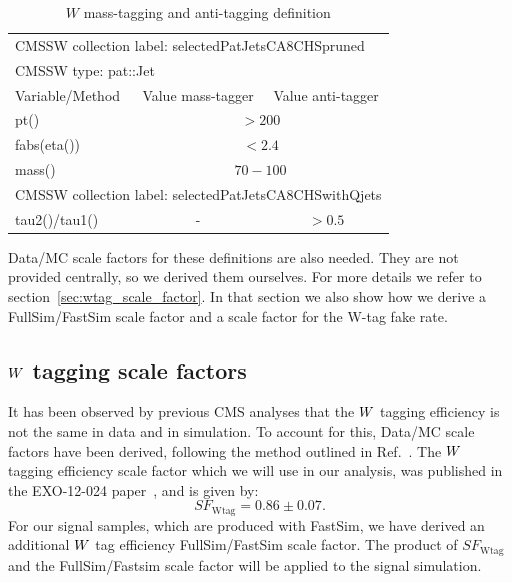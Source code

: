 \begin{table}[htdp]
\caption{$W$ mass-tagging and anti-tagging definition}
\begin{center}
\begin{tabular}{|l|c|c|}
\hline
\multicolumn{3}{|l|}{CMSSW collection label: selectedPatJetsCA8CHSpruned} \\
\multicolumn{3}{|l|}{CMSSW type: pat::Jet} \\
\hline
Variable/Method & Value mass-tagger & Value anti-tagger \\
\hline
pt() & \multicolumn{2}{c|}{$> 200$} \\
fabs(eta()) & \multicolumn{2}{c|}{$< 2.4$} \\
mass() & \multicolumn{2}{c|}{$70-100$} \\
\hline
\multicolumn{3}{|l|}{CMSSW collection label: selectedPatJetsCA8CHSwithQjets} \\
\hline
tau2()/tau1() & - & $> 0.5$ \\
\hline
\end{tabular}
\end{center}
\label{tab:Wtag_mass_anti}
\end{table}

Data/MC scale factors for these definitions are also needed. They are not provided centrally, so we
derived them ourselves. For more details we refer to section~\ref{sec:wtag_scale_factor}. In that
section we also show how we derive a FullSim/FastSim scale factor and a scale factor for the W-tag
fake rate. 


\subsection{\texorpdfstring{$W$}{W} tagging scale factors \label{sec:wtag_scale_factor}}


It has been observed by previous CMS analyses that the $W$ tagging efficiency is not the same in
data and in simulation. To account for this, Data/MC scale factors have been derived, following the
method outlined in Ref.~\cite{CMS-PAS-JME-13-006}.
The $W$ tagging efficiency scale factor which we will use in our analysis, was published in the
EXO-12-024 paper~\cite{EXO-12-024}, and is given by: 
\begin{equation}
SF_{\textrm{Wtag}} = 0.86 \pm 0.07 .
\end{equation}
For our signal samples, which are produced with FastSim, we have derived an additional $W$ tag
efficiency FullSim/FastSim scale factor. The product of
$SF_{\textrm{Wtag}}$ and the FullSim/Fastsim scale factor will be applied to the signal simulation. 


